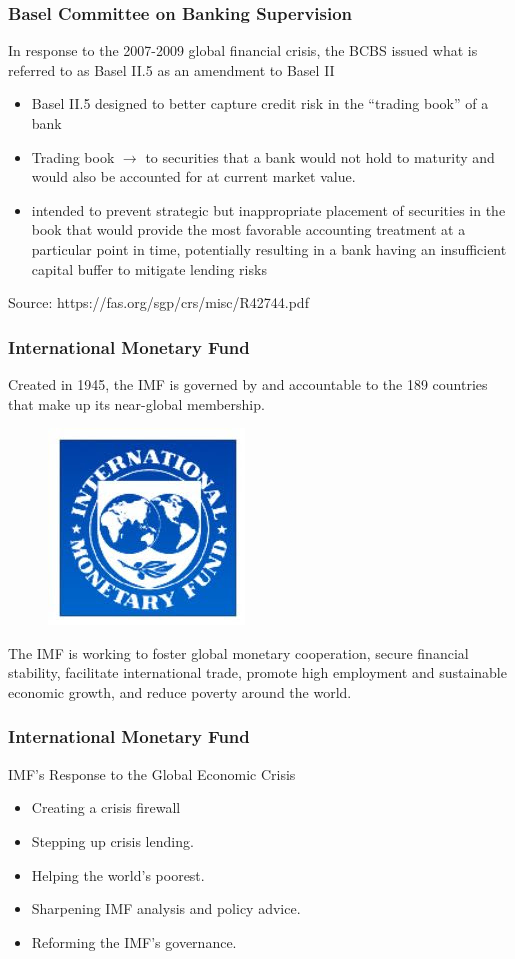 \documentclass[11pt]{beamer}
\begin{document}
\begin{frame}
\frametitle{Basel Committee on Banking Supervision}
In response to the 2007-2009 global financial crisis, the BCBS issued what is referred to as Basel II.5 as an amendment to Basel II
\begin{itemize}
\item Basel II.5 designed to better capture credit risk in the “trading book” of a bank
\item Trading book $\rightarrow$ to securities that a bank would not hold to maturity and would also be accounted for at current market value.
\item intended to prevent strategic but inappropriate placement of
securities in the book that would provide the most favorable accounting treatment at a particular point in time, potentially resulting in a bank having an insufficient capital buffer to mitigate
lending risks
\end{itemize}
\tiny{Source: https://fas.org/sgp/crs/misc/R42744.pdf}
\end{frame}
\begin{frame}
\frametitle{International Monetary Fund}
Created in 1945, the IMF is governed by and accountable to the 189 countries that make up its near-global membership.
\\
\begin{figure}
\includegraphics[]{IMF.png}
\end{figure}
The IMF is  working to foster global monetary cooperation, secure financial stability, facilitate international trade, promote high employment and sustainable economic growth, and reduce poverty around the world.
\end{frame}


\begin{frame}
\frametitle{International Monetary Fund}
IMF’s Response to the Global Economic Crisis
\begin{itemize}
\item Creating a crisis firewall
\item Stepping up crisis lending.
\item Helping the world’s poorest.
\item Sharpening IMF analysis and policy advice.
\item Reforming the IMF’s governance.

\end{itemize}


\end{frame}
\end{document}
